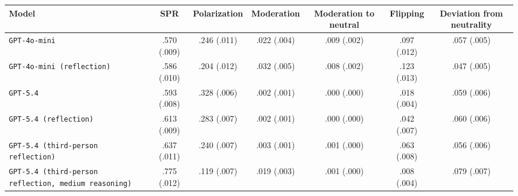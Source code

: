 \begin{tabular}{lcccccc}
		\\
		\hline
		Model & SPR & Polarization & Moderation & Moderation to neutral & Flipping & Deviation from neutrality \\
		\hline
		\texttt{GPT-4o-mini} & .570 (.009) & .246 (.011) & .022 (.004) & .009 (.002) & .097 (.012) & .057 (.005) \\
		\texttt{GPT-4o-mini (reflection)} & .586 (.010) & .204 (.012) & .032 (.005) & .008 (.002) & .123 (.013) & .047 (.005) \\
		\texttt{GPT-5.4} & .593 (.008) & .328 (.006) & .002 (.001) & .000 (.000) & .018 (.004) & .059 (.006) \\
		\texttt{GPT-5.4 (reflection)} & .613 (.009) & .283 (.007) & .002 (.001) & .000 (.000) & .042 (.007) & .060 (.006) \\
		\texttt{GPT-5.4 (third-person reflection)} & .637 (.011) & .240 (.007) & .003 (.001) & .001 (.000) & .063 (.008) & .056 (.006) \\
		\texttt{GPT-5.4 (third-person reflection, medium reasoning)} & .775 (.012) & .119 (.007) & .019 (.003) & .001 (.000) & .008 (.004) & .079 (.007) \\
		\hline
\end{tabular}
